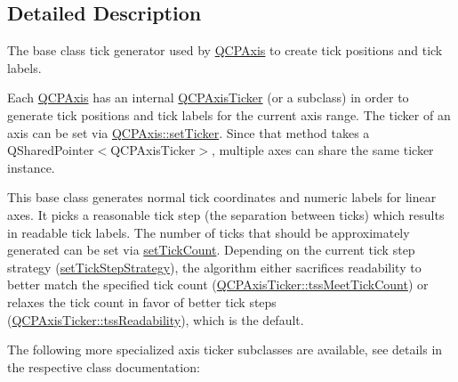 \subsection{Detailed Description}
The base class tick generator used by \hyperlink{class_q_c_p_axis}{Q\+C\+P\+Axis} to create tick positions and tick labels. 

Each \hyperlink{class_q_c_p_axis}{Q\+C\+P\+Axis} has an internal \hyperlink{class_q_c_p_axis_ticker}{Q\+C\+P\+Axis\+Ticker} (or a subclass) in order to generate tick positions and tick labels for the current axis range. The ticker of an axis can be set via \hyperlink{class_q_c_p_axis_a4ee03fcd2c74d05cd1a419b9af5cfbdc}{Q\+C\+P\+Axis\+::set\+Ticker}. Since that method takes a {\ttfamily Q\+Shared\+Pointer$<$\+Q\+C\+P\+Axis\+Ticker$>$}, multiple axes can share the same ticker instance.

This base class generates normal tick coordinates and numeric labels for linear axes. It picks a reasonable tick step (the separation between ticks) which results in readable tick labels. The number of ticks that should be approximately generated can be set via \hyperlink{class_q_c_p_axis_ticker_a47752abba8293e6dc18491501ae34008}{set\+Tick\+Count}. Depending on the current tick step strategy (\hyperlink{class_q_c_p_axis_ticker_a73b1d847c1a12159af6bfda4ebebe7d5}{set\+Tick\+Step\+Strategy}), the algorithm either sacrifices readability to better match the specified tick count (\hyperlink{class_q_c_p_axis_ticker_ab6d2f9d9477821623ac9bc4b21ddf49aa00554450d75d9741f6312a161c49a31f}{Q\+C\+P\+Axis\+Ticker\+::tss\+Meet\+Tick\+Count}) or relaxes the tick count in favor of better tick steps (\hyperlink{class_q_c_p_axis_ticker_ab6d2f9d9477821623ac9bc4b21ddf49aa58661394415760a6eb2fd2f1e6604f40}{Q\+C\+P\+Axis\+Ticker\+::tss\+Readability}), which is the default.

The following more specialized axis ticker subclasses are available, see details in the respective class documentation\+:

